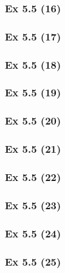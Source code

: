 \subsubsection{Ex 5.5 (16)}\label{sec:Ex_5.5.16}

\subsubsection{Ex 5.5 (17)}\label{sec:Ex_5.5.17}

\subsubsection{Ex 5.5 (18)}\label{sec:Ex_5.5.18}

\subsubsection{Ex 5.5 (19)}\label{sec:Ex_5.5.19}

\subsubsection{Ex 5.5 (20)}\label{sec:Ex_5.5.20}

\newpage		%

\subsubsection{Ex 5.5 (21)}\label{sec:Ex_5.5.21}

\subsubsection{Ex 5.5 (22)}\label{sec:Ex_5.5.22}

\subsubsection{Ex 5.5 (23)}\label{sec:Ex_5.5.23}

\subsubsection{Ex 5.5 (24)}\label{sec:Ex_5.5.24}

\subsubsection{Ex 5.5 (25)}\label{sec:Ex_5.5.25}

